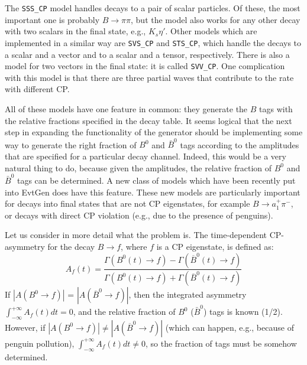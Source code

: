 The {\tt SSS\_CP} model handles decays to a pair of scalar particles.
Of these, the most important one is probably $B \rightarrow \pi\pi$, but the model also 
works for any other decay with two scalars in the final state, e.g., $K_s\eta'$.
Other models which are implemented in a similar way are {\tt SVS\_CP} and {\tt STS\_CP},
which handle the decays to a scalar and a vector and to a scalar and a 
tensor, respectively. There is also a model for two vectors
in the final state: it is called {\tt SVV\_CP}. One complication with this
model is that there are three partial waves that contribute to the 
rate with different CP. 

All of these models have one feature in common: they generate the $B$ tags with the relative
fractions specified in the decay table. It seems logical that the next step in expanding 
the functionality of the generator should be implementing some way to generate the right 
fraction of $B^0$ and $\bar B^0$ tags according to the amplitudes that are specified for a 
particular decay channel.  Indeed, this would be a very natural thing to do, because given 
the amplitudes, the relative fraction of $B^0$ and $\bar B^0$ tags can be determined.  A new class of models which have been recently put into EvtGen does have this feature.  These new models are particularly important for decays into final states that are not
CP eigenstates, for example $B\rightarrow a_1^+\pi^-$, or decays with direct CP violation (e.g., due to the presence of penguins).

Let us consider in more detail what the problem is.  The time-dependent CP-asymmetry for
the decay $B \rightarrow f$, where $f$ is a CP eigenstate, is defined as:
\begin{equation}
A_f(t) = \frac{\Gamma(B^{0}(t) \rightarrow f) - \Gamma(\overline{B}^{0}(t) \rightarrow f)}{\Gamma(B^{0}(t) \rightarrow f) + \Gamma(\overline{B}^{0}(t) \rightarrow f)}
\end{equation}
If $|A(B^{0} \rightarrow f)|$ = $|A(\overline{B}^{0} \rightarrow f)|$, then the integrated 
asymmetry $\int_{-\infty}^{+\infty}A_f(t)dt = 0$, and the relative fraction of $B^{0}$ ($\bar B^0$) tags is known (1/2).  However, if $|A(B^{0} \rightarrow f)| \neq |A(\overline{B}^{0} \rightarrow f)|$ (which can happen, e.g., because of penguin pollution), $\int_{-\infty}^{+\infty}A_f(t)dt \neq 0$, so the fraction of tags must be somehow determined.


